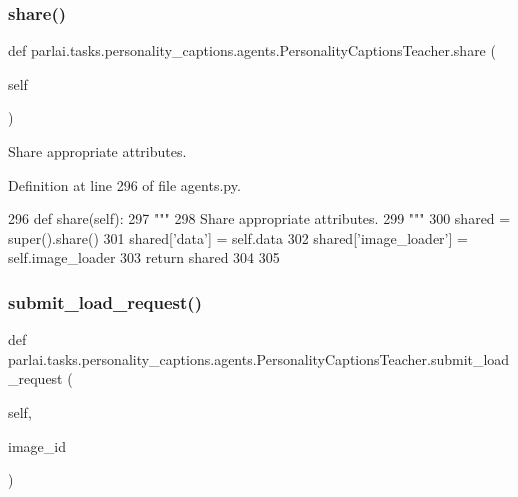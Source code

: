 \subsubsection{\texorpdfstring{share()}{share()}}
{\footnotesize\ttfamily def parlai.\+tasks.\+personality\+\_\+captions.\+agents.\+Personality\+Captions\+Teacher.\+share (\begin{DoxyParamCaption}\item[{}]{self }\end{DoxyParamCaption})}

\begin{DoxyVerb}Share appropriate attributes.
\end{DoxyVerb}
 

Definition at line 296 of file agents.\+py.


\begin{DoxyCode}
296     \textcolor{keyword}{def }share(self):
297         \textcolor{stringliteral}{"""}
298 \textcolor{stringliteral}{        Share appropriate attributes.}
299 \textcolor{stringliteral}{        """}
300         shared = super().share()
301         shared[\textcolor{stringliteral}{'data'}] = self.data
302         shared[\textcolor{stringliteral}{'image\_loader'}] = self.image\_loader
303         \textcolor{keywordflow}{return} shared
304 
305 
\end{DoxyCode}
\mbox{\label{classparlai_1_1tasks_1_1personality__captions_1_1agents_1_1PersonalityCaptionsTeacher_a8b15a0281c0e15c0f4af16da820f7a52}} 
\subsubsection{\texorpdfstring{submit\+\_\+load\+\_\+request()}{submit\_load\_request()}}
{\footnotesize\ttfamily def parlai.\+tasks.\+personality\+\_\+captions.\+agents.\+Personality\+Captions\+Teacher.\+submit\+\_\+load\+\_\+request (\begin{DoxyParamCaption}\item[{}]{self,  }\item[{}]{image\+\_\+id }\end{DoxyParamCaption})}

